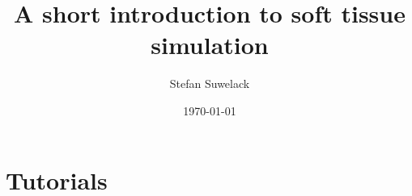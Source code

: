 \documentclass[11pt,a4paper]{book}              %
\title{\bf A short introduction to soft tissue simulation}    %
\author{Stefan Suwelack}              %
\date{\today}                           %
\begin{document}
\part{Tutorials}


\end{document}
